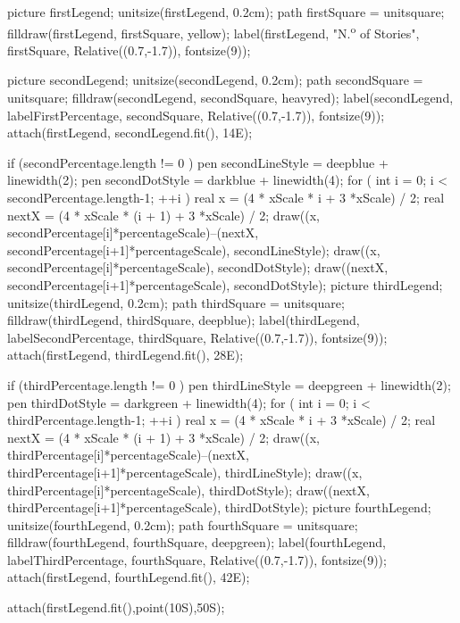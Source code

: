 \begin{asydef}
{  picture firstLegend;
  unitsize(firstLegend, 0.2cm);
  path firstSquare = unitsquare;
  filldraw(firstLegend, firstSquare, yellow);
  label(firstLegend, "N.\textsuperscript{o} of Stories", firstSquare, Relative((0.7,-1.7)), fontsize(9));

  picture secondLegend;
  unitsize(secondLegend, 0.2cm);
  path secondSquare = unitsquare;
  filldraw(secondLegend, secondSquare, heavyred);
  label(secondLegend, labelFirstPercentage, secondSquare, Relative((0.7,-1.7)), fontsize(9));
  attach(firstLegend, secondLegend.fit(), 14E);
  
  if (secondPercentage.length != 0 ) {
	  pen secondLineStyle = deepblue + linewidth(2);
	  pen secondDotStyle = darkblue + linewidth(4);
	  for ( int i = 0; i < secondPercentage.length-1; ++i ){
	    real x = (4 * xScale * i + 3 *xScale) / 2;
	    real nextX = (4 * xScale * (i + 1) + 3 *xScale) / 2;
	    draw((x, secondPercentage[i]*percentageScale)--(nextX, secondPercentage[i+1]*percentageScale), secondLineStyle);
	    draw((x, secondPercentage[i]*percentageScale), secondDotStyle);
	    draw((nextX, secondPercentage[i+1]*percentageScale), secondDotStyle);
	  }
	  picture thirdLegend;
	  unitsize(thirdLegend, 0.2cm);
	  path thirdSquare = unitsquare;
	  filldraw(thirdLegend, thirdSquare, deepblue);
	  label(thirdLegend, labelSecondPercentage, thirdSquare, Relative((0.7,-1.7)), fontsize(9));
	  attach(firstLegend, thirdLegend.fit(), 28E);	  
  }
  
  if (thirdPercentage.length != 0 ) {
	  pen thirdLineStyle = deepgreen + linewidth(2);
	  pen thirdDotStyle = darkgreen + linewidth(4);
	  for ( int i = 0; i < thirdPercentage.length-1; ++i ){
	    real x = (4 * xScale * i + 3 *xScale) / 2;
	    real nextX = (4 * xScale * (i + 1) + 3 *xScale) / 2;
	    draw((x, thirdPercentage[i]*percentageScale)--(nextX, thirdPercentage[i+1]*percentageScale), thirdLineStyle);
	    draw((x, thirdPercentage[i]*percentageScale), thirdDotStyle);
	    draw((nextX, thirdPercentage[i+1]*percentageScale), thirdDotStyle);
	  }
	  picture fourthLegend;
	  unitsize(fourthLegend, 0.2cm);
	  path fourthSquare = unitsquare;
	  filldraw(fourthLegend, fourthSquare, deepgreen);
	  label(fourthLegend, labelThirdPercentage, fourthSquare, Relative((0.7,-1.7)), fontsize(9));
	  attach(firstLegend, fourthLegend.fit(), 42E);	  
  }  
  
  attach(firstLegend.fit(),point(10S),50S);
  
}
\end{asydef}